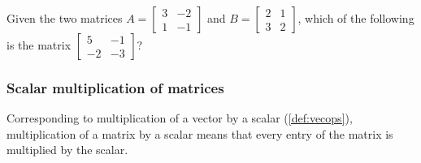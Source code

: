 \begin{activity}
Given the two matrices \(A=\begin{bmatrix} 3&-2\\1&-1 \end{bmatrix}\) and \(B=\begin{bmatrix} 2&1\\3&2 \end{bmatrix}\), which of the following is the matrix \(\begin{bmatrix} 5&-1\\-2&-3 \end{bmatrix}\)?
\end{activity}




\subsubsection{Scalar multiplication of matrices}

Corresponding to multiplication of a vector by a scalar (\autoref{def:vecops}), multiplication of a matrix by a scalar means that every entry of the matrix is multiplied by the scalar.

